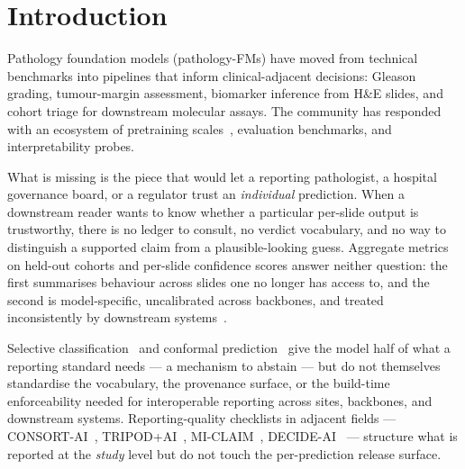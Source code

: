 \documentclass{article}
\begin{document}
\section{Introduction}
\label{sec:intro}

Pathology foundation models (pathology-FMs) have moved from technical benchmarks into pipelines that inform clinical-adjacent decisions: Gleason grading, tumour-margin assessment, biomarker inference from H\&E slides, and cohort triage for downstream molecular assays. The community has responded with an ecosystem of pretraining scales~\citep{filiot2023phikon,chen2024uni,xu2024gigapath,vorontsov2024virchow,wang2022ctranspath}, evaluation benchmarks, and interpretability probes.

What is missing is the piece that would let a reporting pathologist, a hospital governance board, or a regulator trust an \emph{individual} prediction. When a downstream reader wants to know whether a particular per-slide output is trustworthy, there is no ledger to consult, no verdict vocabulary, and no way to distinguish a supported claim from a plausible-looking guess. Aggregate metrics on held-out cohorts and per-slide confidence scores answer neither question: the first summarises behaviour across slides one no longer has access to, and the second is model-specific, uncalibrated across backbones, and treated inconsistently by downstream systems~\citep{kompa2021second}.

Selective classification~\citep{chow1970,cortes2016reject,geifman2017selective,geifman2019selectivenet} and conformal prediction~\citep{vovk2005algorithmic,angelopoulos2021gentle,romano2020classification,olsson2022estimating} give the model half of what a reporting standard needs --- a mechanism to abstain --- but do not themselves standardise the vocabulary, the provenance surface, or the build-time enforceability needed for interoperable reporting across sites, backbones, and downstream systems. Reporting-quality checklists in adjacent fields --- CONSORT-AI~\citep{liu2020consort}, TRIPOD+AI~\citep{collins2024tripod}, MI-CLAIM~\citep{norgeot2020miclaim}, DECIDE-AI~\citep{vasey2022decide} --- structure what is reported at the \emph{study} level but do not touch the per-prediction release surface.
\end{document}
